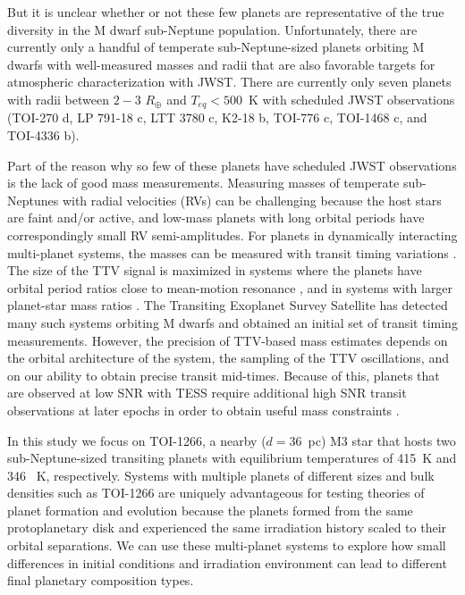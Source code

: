 \documentclass[twocolumn]{aastex631}
\begin{document}
But it is unclear whether or not these few planets are representative of the true diversity in the M dwarf sub-Neptune population. Unfortunately, there are currently only a handful of temperate sub-Neptune-sized planets orbiting M dwarfs with well-measured masses and radii that are also favorable targets for atmospheric characterization with JWST. There are currently only seven planets with radii between $2-3$ $R_{\oplus}$ and $T_{eq}<500$~K with scheduled JWST observations (TOI-270 d, LP 791-18 c, LTT 3780 c, K2-18 b, TOI-776 c, TOI-1468 c, and TOI-4336 b).

Part of the reason why so few of these planets have scheduled JWST observations is the lack of good mass measurements. Measuring masses of temperate sub-Neptunes with radial velocities (RVs) can be challenging because the host stars are faint and/or active, and low-mass planets with long orbital periods have correspondingly small RV semi-amplitudes. For planets in dynamically interacting multi-planet systems, the masses can be measured with transit timing variations  \citep[TTVs, e.g.][]{GreklekMcKeon2023}. The size of the TTV signal is maximized in systems where the planets have orbital period ratios close to mean-motion resonance \citep[MMR;][]{Lithwick_2012}, and in systems with larger planet-star mass ratios \citep[e.g., M dwarfs;][]{Agol_2021}. The Transiting Exoplanet Survey Satellite \citep[TESS,][]{Ricker2014} has detected many such systems orbiting M dwarfs and obtained an initial set of transit timing measurements. However, the precision of TTV-based mass estimates depends on the orbital architecture of the system, the sampling of the TTV oscillations, and on our ability to obtain precise transit mid-times. Because of this, planets that are observed at low SNR with TESS require additional high SNR transit observations at later epochs in order to obtain useful mass constraints \citep{ballard_2019}.  

In this study we focus on TOI-1266, a nearby ($d = 36$~pc) M3 star \citep[$T_{*} = 3563 \pm 77$~K,][]{Stefansson_2020} that hosts two sub-Neptune-sized transiting planets with equilibrium temperatures of 415~K and 346~ K, respectively. Systems with multiple planets of different sizes and bulk densities such as TOI-1266 are uniquely advantageous for testing theories of planet formation and evolution \citep[e.g.,][]{Diamond-Lowe2022,Piaulet2023} because the planets formed from the same protoplanetary disk and experienced the same irradiation history scaled to their orbital separations. We can use these multi-planet systems to explore how small differences in initial conditions and irradiation environment can lead to different final planetary composition types. 
\end{document}
